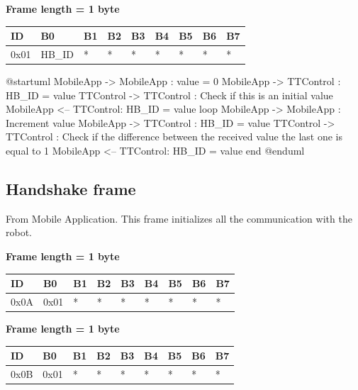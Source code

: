 \documentclass{article}
\begin{document}
\textbf{Frame length = 1 byte}
\begin{center}
    \begin{tabular}{| p{20pt} | p{40pt} | p{40pt} | p{40pt} | p{40pt} | p{40pt} | p{40pt} | p{40pt} | p{40pt} |}
        \hline
        ID   & B0     & B1 & B2 & B3 & B4 & B5 & B6 & B7 \\
        \hline
        0x01 & HB\_ID & *  & *  & *  & *  & *  & *  & *  \\
        \hline
    \end{tabular}
\end{center}

\begin{plantuml}
    @startuml
    MobileApp -> MobileApp : value = 0
    MobileApp -> TTControl : HB_ID = value
    TTControl -> TTControl : Check if this is an initial value
    MobileApp <-- TTControl: HB_ID = value
    loop
        MobileApp -> MobileApp : Increment value
        MobileApp -> TTControl : HB_ID = value
        TTControl -> TTControl : Check if the difference between the received value the last one is equal to 1
        MobileApp <-- TTControl: HB_ID = value
    end
    @enduml
\end{plantuml}


\subsection{Handshake frame}
From Mobile Application. This frame initializes all the communication with the robot.

\textbf{Frame length = 1 byte}
\begin{center}
    \begin{tabular}{| p{20pt} | p{40pt} | p{40pt} | p{40pt} | p{40pt} | p{40pt} | p{40pt} | p{40pt} | p{40pt} |}
        \hline
        ID   & B0   & B1 & B2 & B3 & B4 & B5 & B6 & B7 \\
        \hline
        0x0A & 0x01 & *  & *  & *  & *  & *  & *  & *  \\
        \hline
    \end{tabular}
\end{center}

\textbf{Frame length = 1 byte}
\begin{center}
    \begin{tabular}{| p{20pt} | p{40pt} | p{40pt} | p{40pt} | p{40pt} | p{40pt} | p{40pt} | p{40pt} | p{40pt} |}
        \hline
        ID   & B0   & B1 & B2 & B3 & B4 & B5 & B6 & B7 \\
        \hline
        0x0B & 0x01 & *  & *  & *  & *  & *  & *  & *  \\
        \hline
    \end{tabular}
\end{center}
\end{document}
